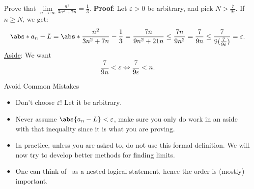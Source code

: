 \begin{Example}{}{}
    Prove that $ \displaystyle \lim\limits_{{n} \to {\infty}}\frac{n^2}{3n^2+7n}=\frac{1}{3} $.
    \tcblower{}
    \textbf{Proof}: Let $ \varepsilon>0 $ be arbitrary, and pick $ N>\frac{7}{9\varepsilon} $.
    If $ n\ge N $, we get:
    \[ \abs*{a_n-L}=\abs*{\frac{n^2}{3n^2+7n}-\frac{1}{3}}=\frac{7n}{9n^2+21n}\le \frac{7n}{9n^2}=\frac{7}{9n}\le \frac{7}{9(\frac{7}{9\varepsilon})}=\varepsilon. \]
    \underline{Aside}: We want
    \[ \frac{7}{9n}<\varepsilon\iff \frac{7}{9\varepsilon}<n. \]
\end{Example}
\begin{Remark}{Avoid Common Mistakes}{}
    \begin{itemize}
        \item Don't choose $ \varepsilon $! Let it be arbitrary.
        \item Never assume $ \abs{a_n-L}<\varepsilon $, make sure you only do work in an aside with that inequality since it is what you
              are proving.
        \item In practice, unless you are asked to, do not use this formal definition. We will now try to develop better methods for finding limits.
        \item One can think of~ as a nested logical statement, hence the order is (mostly) important.
    \end{itemize}
\end{Remark}
